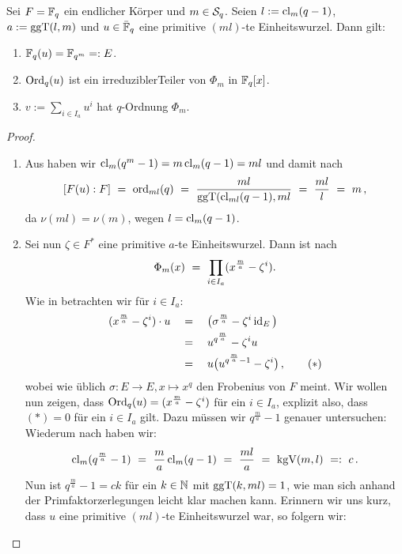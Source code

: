 \begin{satz}
  \label{satz:konstruktion_q_ordnung}
  Sei $F = \F_q$ ein endlicher Körper und $m \in \S_q$. Seien
  $l := \cl_m(q-1)$, $a := \ggT(l,m)$ und $u \in \bar\F_q$ eine primitive
  $(ml)$-te Einheitswurzel. Dann gilt:
  \begin{enumerate}
    \item $\F_q(u) = \F_{q^m} =: E$.
    \item $\Ord_q(u)$ ist ein irreduziblerTeiler von $\Phi_m$ in $\F_q[x]$.
    \item $v := \sum_{i \in I_a} u^i$ hat $q$-Ordnung $\Phi_m$.
  \end{enumerate}
\end{satz}
\begin{proof}
  \begin{enumerate}
  \item Aus  haben wir 
   $\cl_m(q^m-1) = m\cl_m(q-1) = ml$ und
    damit nach  
    \[ [F(u):F] \speq= \ord_{ml}(q) \speq= 
      \frac{ml}{\ggT(\cl_{ml}(q-1), ml} \speq=
      \frac{ml}{l} \speq= m\,,\]
    da $\nu(ml) = \nu(m)$, wegen $l = \cl_m(q-1)$.
  \item Sei nun $\zeta \in F^\ast$ eine primitive $a$-te Einheitswurzel. Dann
    ist nach 
    \[ \Phi_m(x) \speq= \prod_{i\in I_a} (x^{\frac m a} - \zeta^i).\]
    Wie in  betrachten wir für $i \in I_a$:
    \begin{align*}
      (x^{\frac m a} - \zeta^i)\cdot u 
      \quad&=\quad \big( \sigma^{\frac m a} - \zeta^i \id_E \big)\\
        &=\quad u^{q^{\frac m a}} - \zeta^i u \\
        &=\quad u\big( u^{q^{\frac m a}-1} - \zeta^i \big)\,, \tag{$\ast$}
    \end{align*}
    wobei wie üblich $\sigma: E \to E, x \mapsto x^q$ den Frobenius von
    $F$ meint. Wir wollen nun zeigen, dass $\Ord_q(u) = (x^{\frac m a} -
    \zeta^i)$ für ein $i\in I_a$, explizit also, dass $(\ast) = 0$ für ein
    $i\in I_a$ gilt. Dazu müssen wir $q^{\frac m a} -1$ genauer untersuchen:
    Wiederum nach  haben wir:
    \[ \cl_m(q^{\frac m a} -1 ) \speq= \frac m a \cl_m(q-1) \speq=
      \frac{ml}{a} \speq= \kgV(m,l) \speq{=:} c\,.\]
    Nun ist $q^{\frac m a}-1 = ck$ für 
    ein $k\in\N$ mit $\ggT(k,ml) = 1$, wie man sich anhand der 
    Primfaktorzerlegungen leicht klar machen kann. Erinnern wir uns kurz, 
    dass $u$ eine primitive $(ml)$-te Einheitswurzel war, so folgern wir:

\end{enumerate}
\end{proof}
